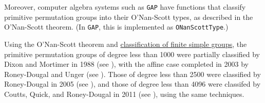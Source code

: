 {    Moreover, computer algebra systems such as \texttt{GAP} have functions that classify primitive permutation groups into their O'Nan-Scott types, as described in the O'Nan-Scott theorem. (In \texttt{GAP}, this is implemented as \texttt{ONanScottType}.)

    Using the O'Nan-Scott theorem and \hyperref[thm:cfsg]{classification of finite simple groups}, the primitive permutation groups of degree less than 1000 were partially classified by Dixon and Mortimer in 1988 (see \cite{dixon1988}), with the affine case completed in 2003 by Roney-Dougal and Unger (see \cite{roney-dougal2003}). Those of degree less than 2500 were classified by Roney-Dougal in 2005 (see \cite{roney-dougal2005}), and those of degree less than 4096 were classifed by Coutts, Quick, and Roney-Dougal in 2011 (see \cite{coutts2011}), using the same techniques.}